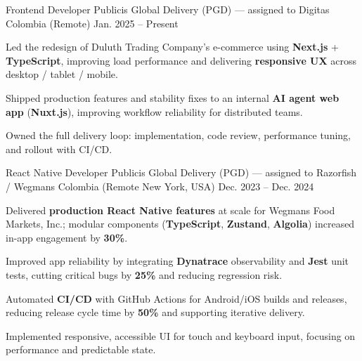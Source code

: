 \newcommand{\quotes}[1]{``#1''}

\begin{cventries}

  \cventry
  {Frontend Developer}
  {Publicis Global Delivery (PGD) — assigned to Digitas}
  {Colombia (Remote)}
  {Jan. 2025 -- Present}
  {
    \begin{cvitems}
      \item {Led the redesign of Duluth Trading Company's e-commerce using \textbf{Next.js} + \textbf{TypeScript}, improving load performance and delivering \textbf{responsive UX} across desktop / tablet / mobile.}
      \item {Shipped production features and stability fixes to an internal \textbf{AI agent web app} (\textbf{Nuxt.js}), improving workflow reliability for distributed teams.}
      \item {Owned the full delivery loop: implementation, code review, performance tuning, and rollout with CI/CD.}
    \end{cvitems}
  }

  \cventry
  {React Native Developer}
  {Publicis Global Delivery (PGD) — assigned to Razorfish / Wegmans}
  {Colombia (Remote \textemdash{} New York, USA)}
  {Dec. 2023 -- Dec. 2024}
  {
    \begin{cvitems}
      \item {Delivered \textbf{production React Native features} at scale for Wegmans Food Markets, Inc.; modular components (\textbf{TypeScript}, \textbf{Zustand}, \textbf{Algolia}) increased in-app engagement by \textbf{30\%}.}
      \item {Improved app reliability by integrating \textbf{Dynatrace} observability and \textbf{Jest} unit tests, cutting critical bugs by \textbf{25\%} and reducing regression risk.}
      \item {Automated \textbf{CI/CD} with GitHub Actions for Android/iOS builds and releases, reducing release cycle time by \textbf{50\%} and supporting iterative delivery.}
      \item {Implemented responsive, accessible UI for touch and keyboard input, focusing on performance and predictable state.}
    \end{cvitems}
  }


\end{cventries}
